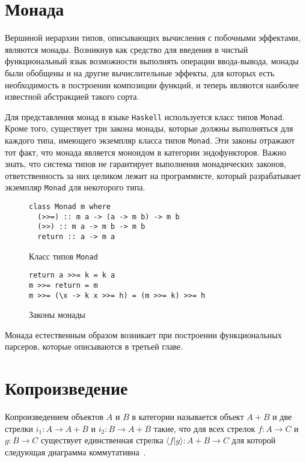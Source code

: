 \section{Монада}

Вершиной иерархии типов, описывающих вычисления с побочными эффектами,
являются монады. Возникнув как средство для введения в чистый функциональный
язык возможности выполнять операции ввода-вывода, монады были обобщены и на
другие вычислительные эффекты, для которых есть необходимость в построении
композиции функций, и теперь являются наиболее известной абстракцией такого
сорта.

Для представления монад в языке \lstinline{Haskell} используется класс типов
\lstinline{Monad}. Кроме того, существует три закона монады, которые должны
выполняться для каждого типа, имеющего экземпляр класса типов \lstinline{Monad}.
Эти законы отражают тот факт, что монада является моноидом в категории
эндофункторов. Важно знать, что система типов не гарантирует выполнения
монадических законов, ответственность за них целиком лежит на программисте,
который разрабатывает экземпляр \lstinline{Monad} для некоторого типа.

\begin{figure}[h]
\begin{lstlisting}
class Monad m where
  (>>=) :: m a -> (a -> m b) -> m b
  (>>) :: m a -> m b -> m b
  return :: a -> m a
\end{lstlisting}
\caption{Класс типов \lstinline{Monad}}
\label{listing:Monad}
\end{figure}

\begin{figure}[h]
\begin{lstlisting}
return a >>= k = k a
m >>= return = m
m >>= (\x -> k x >>= h) = (m >>= k) >>= h
\end{lstlisting}
\caption{Законы монады}
\label{listing:MonadLaws}
\end{figure}

Монада естественным образом возникает при построении функциональных парсеров,
которые описываются в третьей главе.

\section{Копроизведение}

Копроизведением объектов $A$ и $B$ в категории называется объект $A + B$ и две
стрелки $i_1 : A \to A + B$ и $i_2 : B \to A + B$ такие, что для всех стрелок
$f : A \to C$ и $g : B \to C$ существует единственная стрелка
$\langle f|g\rangle  : A + B \to C$ для которой следующая диаграмма
коммутативна~\cite{TeorCat}.

